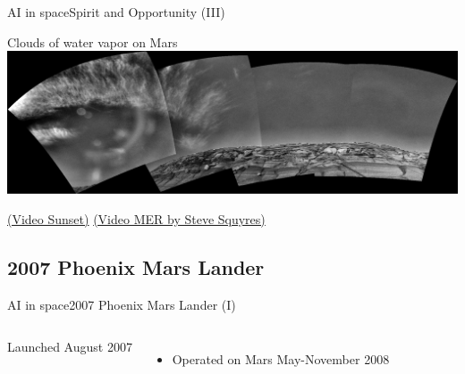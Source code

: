 \documentclass[10pt,compress]{beamer} %
\begin{document}
{	\begin{frame}{AI in space}{Spirit and Opportunity (III)}
		\vspace{-0.4cm}
		\begin{center}
		Clouds of water vapor on Mars\\\bigskip
			\includegraphics[width=0.9\linewidth]{figs/clouds.jpg}
		\end{center}

		\href{https://www.youtube.com/watch?v=LPKtuyB8E20}{(Video Sunset)} \href{https://www.youtube.com/watch?v=p1m9p2uomE8}{(Video MER by Steve Squyres)}
	\end{frame}

	\subsection{2007 Phoenix Mars Lander}
	\begin{frame}{AI in space}{2007 Phoenix Mars Lander (I)}
		\begin{columns}
				Launched August 2007
				\begin{itemize}
				\item Operated on Mars May-November 2008
				\end{itemize}


\end{columns}
\end{frame}}
\end{document}
